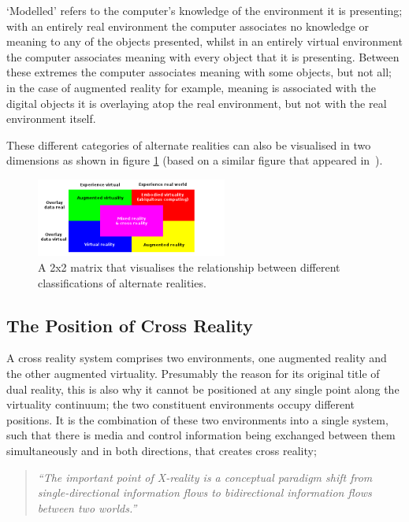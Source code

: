 \documentclass{sig-alternate}
\begin{document}
`Modelled' refers to the computer's knowledge of the environment it is presenting; with an entirely real environment the computer associates no knowledge or meaning to any of the objects presented, whilst in an entirely virtual environment the computer associates meaning with every object that it is presenting. Between these extremes the computer associates meaning with some objects, but not all; in the case of augmented reality for example, meaning is associated with the digital objects it is overlaying atop the real environment, but not with the real environment itself.

These different categories of alternate realities can also be visualised in two dimensions as shown in figure \ref{virtualitymatrix} (based on a similar figure that appeared in~\cite{Want2009}).

\begin{figure}[h!tbp]
\centering
\includegraphics[width=0.56\textwidth]{virtualitymatrix.png}
\caption{A 2x2 matrix that visualises the relationship between different classifications of alternate realities.}
\label{virtualitymatrix}
\end{figure}

\subsection{The Position of Cross Reality}
A cross reality system comprises two environments, one augmented reality and the other augmented virtuality. Presumably the reason for its original title of dual reality, this is also why it cannot be positioned at any single point along the virtuality continuum; the two constituent environments occupy different positions. It is the combination of these two environments into a single system, such that there is media and control information being exchanged between them simultaneously and in both directions, that creates cross reality;

\begin{quotation}
	\textit{``The important point of X-reality is a conceptual paradigm shift from single-directional information flows to bidirectional information flows between two worlds.''}~\cite{kim:practical}
\end{quotation}
\end{document}
